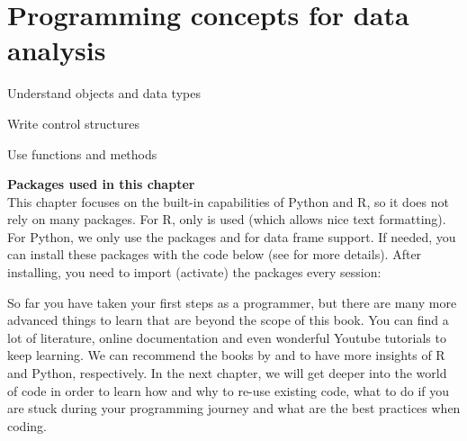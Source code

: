 \chapter{Programming concepts for data analysis}
\label{chap:programmingconcepts}

\begin{abstract}{Abstract}
  This chapter introduces readers to the basics of programming
  in Python and R. It
explains how to deal with objects, statements, expressions, variables
and different types of data, and shows how to create and understand
simple control structures such as loops and conditions.
\end{abstract}


\begin{objectives}
\item Understand objects and data types
\item Write control structures
\item Use functions and methods
\end{objectives}

\newpage
\begin{feature}
  \textbf{Packages used in this chapter}\\
  This chapter focuses on the built-in capabilities of Python and R,
  so it does not rely on many packages.
  For R, only  is used (which allows nice text formatting).
  For Python, we only use the packages  and 
  for data frame support.
  If needed, you can install these packages with the code below
  (see  for more details).
  \noindent After installing, you need to import (activate) the packages every session:
\end{feature}








So far you have taken your first steps as a programmer, but there are many
more advanced things to learn that are beyond the scope of this
book. You can find a lot of literature, online documentation and even
wonderful Youtube tutorials to keep learning. We can recommend the
books by \cite{crawley2012r} and \cite{vanderplas2016python} to have
more insights of R and Python, respectively. In the next chapter, we
will get deeper into the world of code in order to learn how and why
to re-use existing code, what to do if you are stuck during your
programming journey and what are the best practices when coding.
